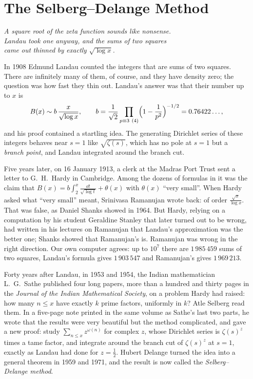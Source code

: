 \chapter{The Selberg--Delange Method}\label{ch:sd}
\begin{center}\itshape
A square root of the zeta function sounds like nonsense.\\
Landau took one anyway, and the sums of two squares\\
came out thinned by exactly $\sqrt{\log x}$.
\end{center}

In 1908 Edmund Landau counted the integers that are sums of two squares. There are infinitely many of them, of course, and they have density zero; the question was how fast they thin out. Landau's answer was that their number up to $x$ is
\[
B(x)\sim b\,\frac x{\sqrt{\log x}},\qquad b=\frac1{\sqrt2}\prod_{p\equiv3\ (4)}\Bigl(1-\frac1{p^2}\Bigr)^{-1/2}=0.76422\ldots,
\]
and his proof contained a startling idea. The generating Dirichlet series of these integers behaves near $s=1$ like $\sqrt{\zeta(s)}$, which has no pole at $s=1$ but a \emph{branch point}, and Landau integrated around the branch cut.

Five years later, on 16 January 1913, a clerk at the Madras Port Trust sent a letter to G.~H.~Hardy in Cambridge. Among the dozens of formulas in it was the claim that $B(x)=b\int_2^x\frac{\dd t}{\sqrt{\log t}}+\theta(x)$ with $\theta(x)$ ``very small''. When Hardy asked what ``very small'' meant, Srinivasa Ramanujan wrote back: of order $\frac{\sqrt x}{\log x}$. That was false, as Daniel Shanks showed in 1964. But Hardy, relying on a computation by his student Geraldine Stanley that later turned out to be wrong, had written in his lectures on Ramanujan that Landau's approximation was the better one; Shanks showed that Ramanujan's is. Ramanujan was wrong in the right direction. Our own computer agrees: up to $10^7$ there are $1\,985\,459$ sums of two squares, Landau's formula gives $1\,903\,547$ and Ramanujan's gives $1\,969\,213$.

Forty years after Landau, in 1953 and 1954, the Indian mathematician L.~G.~Sathe published four long papers, more than a hundred and thirty pages in the \emph{Journal of the Indian Mathematical Society}, on a problem Hardy had raised: how many $n\le x$ have exactly $k$ prime factors, uniformly in $k$? Atle Selberg read them. In a five-page note printed in the same volume as Sathe's last two parts, he wrote that the results were very beautiful but the method complicated, and gave a new proof: study $\sum_{n\le x}z^{\omega(n)}$ for complex $z$, whose Dirichlet series is $\zeta(s)^z$ times a tame factor, and integrate around the branch cut of $\zeta(s)^z$ at $s=1$, exactly as Landau had done for $z=\frac12$. Hubert Delange turned the idea into a general theorem in 1959 and 1971, and the result is now called the \emph{Selberg--Delange method}.

